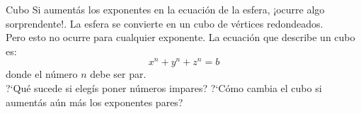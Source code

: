 \begin{surferPage}{Cubo}
Si aument{\'a}s los exponentes en la ecuaci{\'o}n de la esfera, ¡ocurre algo sorprendente!. La esfera se convierte en un cubo de v{\'e}rtices redondeados.\\
\vspace{0.3cm}
Pero esto no ocurre para cualquier exponente. La ecuaci{\'o}n que describe un cubo es:
\[x^n+y^n+z^n=b\]
donde el n{\'u}mero $n$ debe ser par.\\
\vspace{0.3cm}
?`Qu{\'e} sucede si eleg{\'i}s poner n{\'u}meros impares? ?`C{\'o}mo cambia el cubo si aument{\'a}s a{\'u}n m{\'a}s los exponentes pares?
\end{surferPage}
